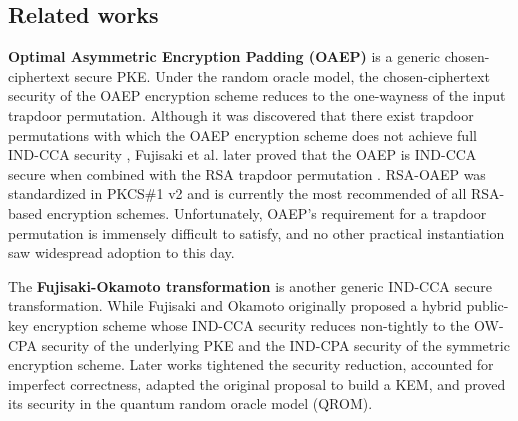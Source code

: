 \documentclass[journal=tches,submission]{iacrtrans}
\begin{document}
\subsection{Related works}
\textbf{Optimal Asymmetric Encryption Padding (OAEP)} \cite{DBLP:conf/eurocrypt/BellareR94}\cite{DBLP:conf/crypto/BellareDPR98} is a generic chosen-ciphertext secure PKE. Under the random oracle model, the chosen-ciphertext security of the OAEP encryption scheme reduces to the one-wayness of the input trapdoor permutation. Although it was discovered that there exist trapdoor permutations with which the OAEP encryption scheme does not achieve full IND-CCA security \cite{DBLP:journals/joc/Shoup02}, Fujisaki et al. later proved that the OAEP is IND-CCA secure when combined with the RSA trapdoor permutation \cite{DBLP:conf/crypto/FujisakiOPS01}\cite{DBLP:journals/cacm/RivestSA78}. RSA-OAEP was standardized in PKCS\#1 v2 \cite{rfc8017} and is currently the most recommended of all RSA-based encryption schemes. Unfortunately, OAEP's requirement for a trapdoor permutation is immensely difficult to satisfy, and no other practical instantiation saw widespread adoption to this day.

The \textbf{Fujisaki-Okamoto transformation} \cite{DBLP:conf/crypto/FujisakiO99}\cite{DBLP:journals/joc/FujisakiO13} is another generic IND-CCA secure transformation. While Fujisaki and Okamoto originally proposed a hybrid public-key encryption scheme whose IND-CCA security reduces non-tightly to the OW-CPA security of the underlying PKE and the IND-CPA security of the symmetric encryption scheme. Later works \cite{DBLP:conf/ima/Dent03}\cite{DBLP:conf/tcc/HofheinzHK17}\cite{DBLP:conf/eurocrypt/DworkNR04}\cite{DBLP:conf/asiacrypt/HovelmannsHM22}\cite{bernstein2018towards}  tightened the security reduction, accounted for imperfect correctness, adapted the original proposal to build a KEM, and proved its security in the quantum random oracle model (QROM).
\end{document}
